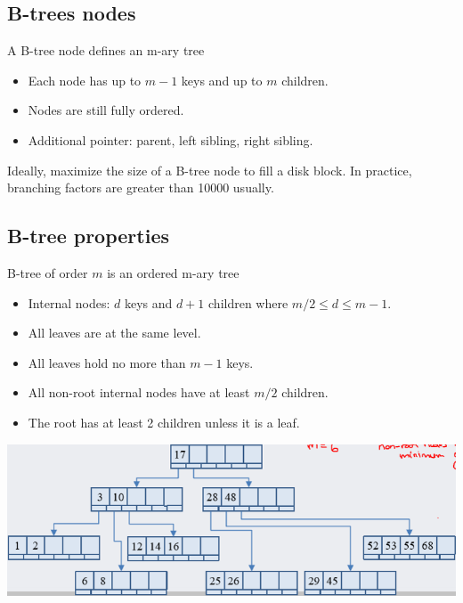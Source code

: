 \documentclass[letterpaper,12pt]{article}
\begin{document}
\subsection{B-trees nodes}
A B-tree node defines an m-ary tree \begin{itemize}
    \item Each node has up to $m-1$ keys and up to $m$ children.
    \item Nodes are still fully ordered.
    \item Additional pointer: parent, left sibling, right sibling.
\end{itemize}
Ideally, maximize the size of a B-tree node to fill a disk block. In practice, branching factors are greater than 10000 usually. 
\subsection{B-tree properties}
B-tree of order $m$ is an ordered m-ary tree\begin{itemize}
    \item Internal nodes: $d$ keys and $d+1$ children where $m/2 \leq d \leq m-1$.
    \item All leaves are at the same level.
    \item All leaves hold no more than $m-1$ keys.
    \item All non-root internal nodes have at least $m/2$ children.
    \item The root has at least 2 children unless it is a leaf.
\end{itemize}
\includegraphics*{./Images/B-tree example.png}
\end{document}
